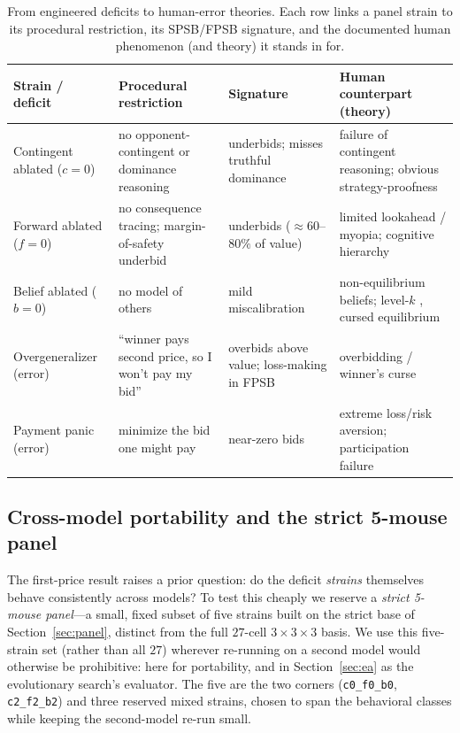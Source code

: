 \documentclass[12pt]{article}
\begin{document}
\begin{table}[t]
\centering
\caption{From engineered deficits to human-error theories. Each row links a panel
strain to its procedural restriction, its SPSB/FPSB signature, and the documented
human phenomenon (and theory) it stands in for.}
\label{tab:errormap}
\footnotesize
\setlength{\tabcolsep}{4pt}
\begin{tabular}{@{}p{}p{}p{}p{}@{}}
\toprule
Strain / deficit & Procedural restriction & Signature & Human counterpart (theory) \\
\midrule
Contingent ablated ($c{=}0$) & no opponent-contingent or dominance reasoning & underbids; misses truthful dominance & failure of contingent reasoning; obvious strategy-proofness \citep{li2017} \\
\addlinespace
Forward ablated ($f{=}0$) & no consequence tracing; margin-of-safety underbid & underbids ($\approx60$--$80\%$ of value) & limited lookahead / myopia; cognitive hierarchy \\
\addlinespace
Belief ablated ($b{=}0$) & no model of others & mild miscalibration & non-equilibrium beliefs; level-$k$ \citep{crawfordiriberri2007}, cursed equilibrium \citep{eysterrabin2005} \\
\addlinespace
Overgeneralizer (error) & ``winner pays second price, so I won't pay my bid'' & overbids above value; loss-making in FPSB & overbidding / winner's curse \citep{kagellevin1993,crawfordiriberri2007} \\
\addlinespace
Payment panic (error) & minimize the bid one might pay & near-zero bids & extreme loss/risk aversion; participation failure \\
\bottomrule
\end{tabular}
\end{table}

\subsection{Cross-model portability and the strict 5-mouse panel}

The first-price result raises a prior question: do the deficit \emph{strains}
themselves behave consistently across models? To test this cheaply we reserve a
\emph{strict 5-mouse panel}---a small, fixed subset of five strains built on the
strict base of Section~\ref{sec:panel}, distinct from the full $27$-cell
$3\times3\times3$ basis. We use this five-strain set (rather than all $27$) wherever
re-running on a second model would otherwise be prohibitive: here for portability,
and in Section~\ref{sec:ea} as the evolutionary search's evaluator. The five are
the two corners (\texttt{c0\_f0\_b0}, \texttt{c2\_f2\_b2}) and three reserved
mixed strains, chosen to span the behavioral classes while keeping the second-model
re-run small.
\end{document}
